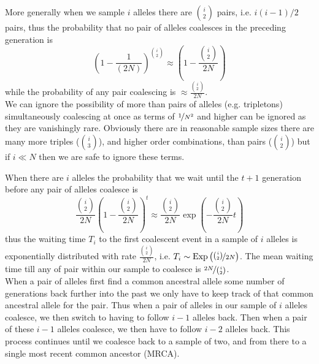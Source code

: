 More generally when we sample $i$ alleles there are ${i \choose
 2}$ pairs, i.e. $i(i-1)/2$ pairs, thus the probability that no pair
of alleles coalesces in the preceding generation is
\begin{equation}
\left(1-\frac{1}{(2N)} \right)^{{i \choose
 2}} \approx \left( 1- \frac{{i \choose
 2}}{2N}\right)
\end{equation}
while the probability of any pair coalescing is $\approx \frac{{i \choose
 2}}{2N}$.\\

We can ignore the possibility of more than pairs of alleles (e.g. tripletons)
simultaneously coalescing at once as terms of $\nicefrac{1}{N^2}$ and higher
can be ignored as they are vanishingly rare. Obviously there are in reasonable
sample sizes there are many more triples (${i \choose 3}$), and higher order
combinations, than pairs (${i \choose 2}$) but if $i \ll N$ then we are safe to
ignore these terms.

When there are $i$ alleles the probability that we wait until the
$t+1$ generation before
any pair of alleles coalesce is
\begin{equation}
 \frac{{i \choose
 2}}{2N}\left( 1- \frac{{i \choose
 2}}{2N}\right)^{t} \approx  \frac{{i \choose
 2}}{2N} \exp \left( - \frac{{i \choose
 2}}{2N} t \right)
\end{equation}
thus the waiting time $T_i$ to the first coalescent event in a sample
of $i$ alleles is exponentially distributed with rate $\frac{{i \choose
2}}{2N}$, i.e. $T_i \sim \text{Exp}\left(\nicefrac{{i \choose
 2}}{2N} \right)$. The mean waiting time till any of pair within our
 sample to coalesce is $\nicefrac{2N}{{i \choose
 2}}$.\\

When a pair of alleles first find a common ancestral allele some
number of generations back further into the past we only have to keep
track of that common ancestral allele for the pair. Thus when a pair
of alleles in our sample of $i$ alleles coalesce, we then switch to
having to follow $i-1$ alleles back. Then when a pair of these $i-1$
alleles coalesce, we then have to follow $i-2$ alleles back. This
process continues until we coalesce back to a sample of two, and from
there to a single most recent common ancestor (MRCA).\\


